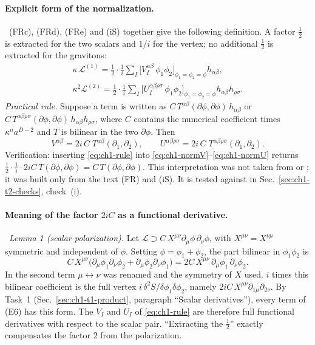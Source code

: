\paragraph{Explicit form of the normalization.} \tA\ (FRc), (FRd), (FRe) and
(iS) together give the following definition. A factor $\tfrac12$ is extracted
for the two scalars and $1/i$ for the vertex; no additional $\tfrac12$ is
extracted for the gravitons:
\begin{gather}
\kappa\,\mathcal L^{(1)}=\frac12\cdot\frac1i\sum_I\Big[V_I^{\alpha\beta}\,\phi_1\phi_2\Big]_{\phi_1=\phi_2=\phi}h_{\alpha\beta},
\label{eq:ch1-normV}\\
\kappa^2\mathcal L^{(2)}=\frac12\cdot\frac1i\sum_I\Big[U_I^{\alpha\beta\rho\sigma}\,\phi_1\phi_2\Big]_{\phi_1=\phi_2=\phi}h_{\alpha\beta}h_{\rho\sigma}.
\label{eq:ch1-normU}
\end{gather}
\emph{Practical rule.} Suppose a term is written as
$C\,T^{\alpha\beta}(\partial\phi,\partial\phi)\,h_{\alpha\beta}$ or
$C\,T^{\alpha\beta\rho\sigma}(\partial\phi,\partial\phi)\,h_{\alpha\beta}h_{\rho\sigma}$,
where $C$ contains the numerical coefficient times $\kappa^n a^{D-2}$ and $T$ is
bilinear in the two $\partial\phi$. Then
\begin{equation}
V^{\alpha\beta}=2i\,C\;T^{\alpha\beta}(\partial_1,\partial_2),\qquad U^{\alpha\beta\rho\sigma}=2i\,C\;T^{\alpha\beta\rho\sigma}(\partial_1,\partial_2).
\label{eq:ch1-rule}
\end{equation}
Verification: inserting \eqref{eq:ch1-rule} into
\eqref{eq:ch1-normV}--\eqref{eq:ch1-normU} returns
$\tfrac12\cdot\tfrac1i\cdot2iC\,T(\partial\phi,\partial\phi)=C\,T(\partial\phi,\partial\phi)$.
This interpretation was not taken from  or ; it was built only
from the text (FR) and (iS). It is tested against  in
Sec.~\ref{sec:ch1-t2-checks}, check~(i).

\paragraph{Meaning of the factor $2iC$ as a functional derivative.} \tD\
\emph{Lemma 1 (scalar polarization).} Let $\mathcal L\supset C\,X^{\mu\nu}\partial_\mu\phi\,\partial_\nu\phi$,
with $X^{\mu\nu}=X^{\nu\mu}$ symmetric and independent of $\phi$. Setting
$\phi=\phi_1+\phi_2$, the part bilinear in $\phi_1\phi_2$ is
\begin{equation}
C\,X^{\mu\nu}\big(\partial_\mu\phi_1\partial_\nu\phi_2+\partial_\mu\phi_2\partial_\nu\phi_1\big)=2C\,X^{\mu\nu}\,\partial_\mu\phi_1\,\partial_\nu\phi_2 .
\label{eq:ch1-lemma1}
\end{equation}
In the second term $\mu\leftrightarrow\nu$ was renamed and the symmetry of $X$
used. $i$ times this bilinear coefficient is the full vertex
$i\,\delta^2S/\delta\phi_1\delta\phi_2$, namely
$2iC\,X^{\mu\nu}\partial_{1\mu}\partial_{2\nu}$. By Task~1
(Sec.~\ref{sec:ch1-t1-product}, paragraph ``Scalar derivatives''), every term
of (E6) has this form. The $V_I$ and $U_I$ of \eqref{eq:ch1-rule} are therefore
full functional derivatives with respect to the scalar pair. ``Extracting the
$\tfrac12$'' exactly compensates the factor $2$ from the polarization.

